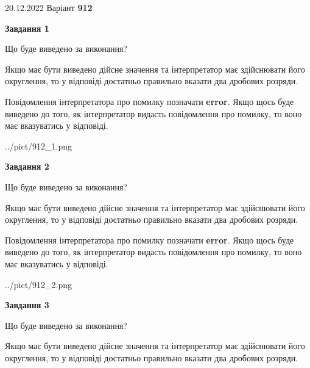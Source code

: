 \documentclass[12pt, ukrainian]{article}
\begin{document}
{20.12.2022 Варіант \No \textbf { 912 }\par}
{
\begin {Large}

{\begin {center}\textbf{Завдання 1}\end {center}}\par
Що буде виведено за виконання? \par

Якщо має бути виведено дійсне значення та інтерпретатор має здійснювати його округлення, 
то у відповіді достатньо правильно вказати два дробових розряди.

Повідомлення інтерпретатора про помилку позначати \textbf{error}.
Якщо щось буде виведено до того, як інтерпретатор видасть повідомлення про помилку, 
то воно має вказуватись у відповіді. \par

\begin{center}
	{../pict/912_1.png}
\end{center}
\newpage

{\begin {center}\textbf{Завдання 2}\end {center}}\par
Що буде виведено за виконання? \par

Якщо має бути виведено дійсне значення та інтерпретатор має здійснювати його округлення, 
то у відповіді достатньо правильно вказати два дробових розряди.

Повідомлення інтерпретатора про помилку позначати \textbf{error}.
Якщо щось буде виведено до того, як інтерпретатор видасть повідомлення про помилку, 
то воно має вказуватись у відповіді. \par

\begin{center}
	{../pict/912_2.png}
\end{center}
\newpage

{\begin {center}\textbf{Завдання 3}\end {center}}\par
Що буде виведено за виконання? \par

Якщо має бути виведено дійсне значення та інтерпретатор має здійснювати його округлення, 
то у відповіді достатньо правильно вказати два дробових розряди.


\end{Large}}
\end{document}
